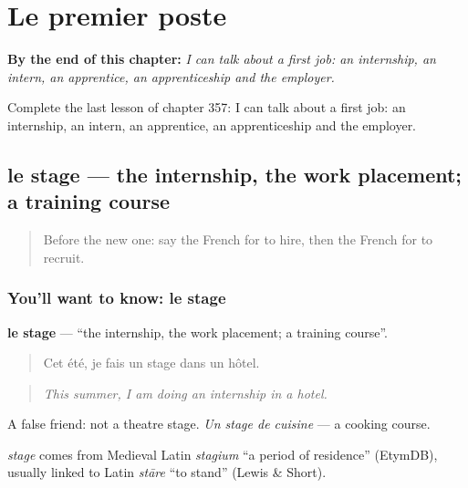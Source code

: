 
\chapter{Le premier poste}
\label{ch:fr-le-premier-poste}

\begin{chapteropening}
\textbf{By the end of this chapter:} \emph{I can talk about a first job: an internship, an intern, an apprentice, an apprenticeship and the employer.}

Complete the last lesson of chapter 357: I can talk about a first job: an internship, an intern, an apprentice, an apprenticeship and the employer.
\end{chapteropening}

\section[le stage]{le stage — the internship, the work placement; a training course}

\label{lesson:FR-C357-stage}



\begin{quote}
Before the new one: say the French for to hire, then the French for to recruit.
\end{quote}

\subsection*{You'll want to know: le stage}
\textbf{le stage} — \textquotedblleft{}the internship, the work placement; a training course\textquotedblright{}.

\begin{quote}
Cet été, je fais un stage dans un hôtel.
\end{quote}

\begin{quote}
\emph{This summer, I am doing an internship in a hotel.}
\end{quote}

A false friend: not a theatre stage. \emph{Un stage de cuisine} — a cooking course.

\begin{cousinweb}
\emph{stage} comes from Medieval Latin \emph{stagium} \textquotedblleft{}a period of residence\textquotedblright{} (EtymDB), usually linked to Latin \emph{stāre} \textquotedblleft{}to stand\textquotedblright{} (Lewis \& Short).
\end{cousinweb}

